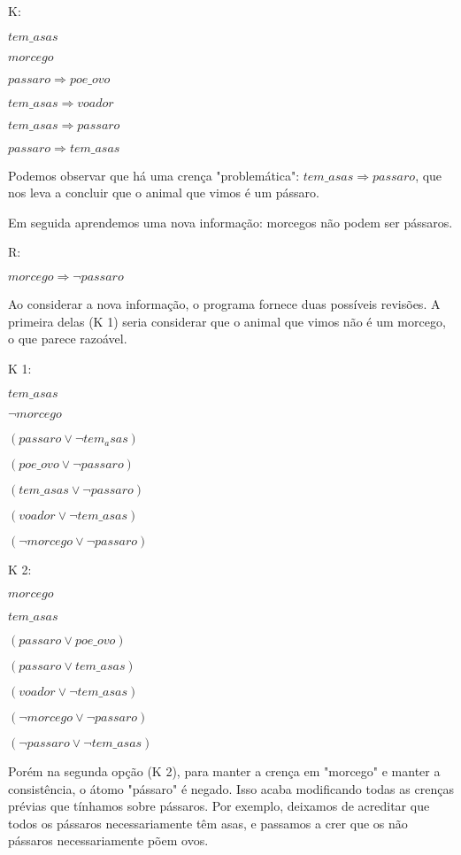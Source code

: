 \documentclass[10pt,a4paper]{amsart}
\begin{document}
\begin{framed}
K:

$tem\_asas$

$morcego$

$passaro \Rightarrow poe\_ovo$

$tem\_asas \Rightarrow voador$

$tem\_asas \Rightarrow passaro$

$passaro \Rightarrow tem\_asas$
\end{framed}

Podemos observar que há uma crença "problemática": $tem\_asas \Rightarrow passaro$, que nos leva a concluir que o animal que vimos é um pássaro.

Em seguida aprendemos uma nova informação: morcegos não podem ser pássaros.
\begin{framed}
R:

$morcego \Rightarrow \neg passaro$
\end{framed}

Ao considerar a nova informação, o programa fornece duas possíveis revisões.
A primeira delas (K 1) seria considerar que o animal que vimos não é um morcego, o que parece razoável.

\begin{framed}
K 1:

$tem\_asas$

$\neg morcego$

$(passaro \lor \neg tem_asas)$

$(poe\_ovo \lor \neg passaro)$

$(tem\_asas \lor \neg passaro)$

$(voador \lor \neg tem\_asas)$

$(\neg morcego \lor \neg passaro)$
\end{framed}

\begin{framed}
K 2:

$morcego$

$tem\_asas$

$(passaro \lor poe\_ovo)$

$(passaro \lor tem\_asas)$

$(voador \lor \neg tem\_asas)$

$(\neg morcego \lor \neg passaro)$

$(\neg passaro \lor \neg tem\_asas)$
\end{framed}

Porém na segunda opção (K 2), para manter a crença em "morcego" e manter a consistência, o átomo "pássaro" é negado.
Isso acaba modificando todas as crenças prévias que tínhamos sobre pássaros. Por exemplo, deixamos de acreditar que todos os pássaros necessariamente têm asas, e passamos a crer que os não pássaros necessariamente põem ovos.
\end{document}
